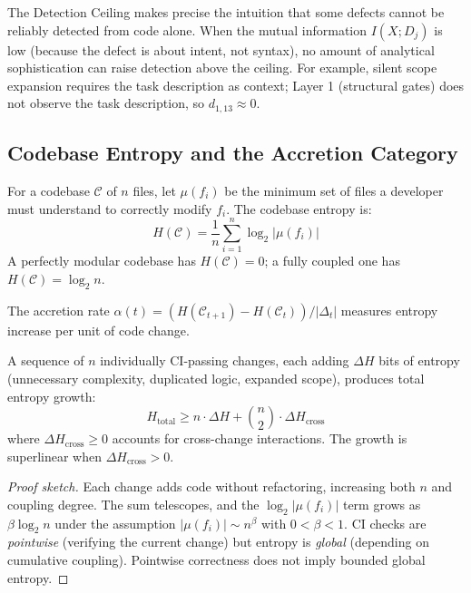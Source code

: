 The Detection Ceiling makes precise the intuition that some defects cannot be reliably detected from code alone. When the mutual information $I(X; D_j)$ is low (because the defect is about intent, not syntax), no amount of analytical sophistication can raise detection above the ceiling. For example, silent scope expansion requires the task description as context; Layer 1 (structural gates) does not observe the task description, so $d_{1,13} \approx 0$.

\subsection{Codebase Entropy and the Accretion Category}

\begin{definition}
\label{def:codebase-entropy}
For a codebase $\mathcal{C}$ of $n$ files, let $\mu(f_i)$ be the minimum set of files a developer must understand to correctly modify $f_i$. The codebase entropy is:
\begin{equation}
H(\mathcal{C}) = \frac{1}{n} \sum_{i=1}^{n} \log_2 |\mu(f_i)|
\end{equation}
A perfectly modular codebase has $H(\mathcal{C}) = 0$; a fully coupled one has $H(\mathcal{C}) = \log_2 n$.
\end{definition}

\begin{definition}
The accretion rate $\alpha(t) = (H(\mathcal{C}_{t+1}) - H(\mathcal{C}_t)) / |\Delta_t|$ measures entropy increase per unit of code change.
\end{definition}

\begin{theorem}
\label{thm:compound-degradation}
A sequence of $n$ individually CI-passing changes, each adding $\Delta H$ bits of entropy (unnecessary complexity, duplicated logic, expanded scope), produces total entropy growth:
\begin{equation}
    H_{\text{total}} \geq n \cdot \Delta H + \binom{n}{2} \cdot \Delta H_{\text{cross}}
\end{equation}
where $\Delta H_{\text{cross}} \geq 0$ accounts for cross-change interactions. The growth is superlinear when $\Delta H_{\text{cross}} > 0$.
\end{theorem}

\begin{proof}[Proof sketch]
Each change adds code without refactoring, increasing both $n$ and coupling degree. The sum telescopes, and the $\log_2 |\mu(f_i)|$ term grows as $\beta \log_2 n$ under the assumption $|\mu(f_i)| \sim n^\beta$ with $0 < \beta < 1$. CI checks are \emph{pointwise} (verifying the current change) but entropy is \emph{global} (depending on cumulative coupling). Pointwise correctness does not imply bounded global entropy.
\end{proof}

